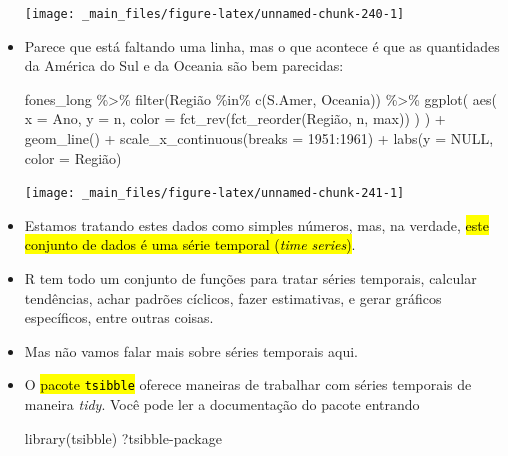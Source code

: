 \documentclass[
  11pt]{report}
\newenvironment{Shaded}{\begin{snugshade}}{\end{snugshade}}
\newcommand{\AttributeTok}[1]{\textcolor[rgb]{0.77,0.63,0.00}{#1}}
\newcommand{\ConstantTok}[1]{\textcolor[rgb]{0.00,0.00,0.00}{#1}}
\newcommand{\DecValTok}[1]{\textcolor[rgb]{0.00,0.00,0.81}{#1}}
\newcommand{\FunctionTok}[1]{\textcolor[rgb]{0.00,0.00,0.00}{#1}}
\newcommand{\NormalTok}[1]{#1}
\newcommand{\SpecialCharTok}[1]{\textcolor[rgb]{0.00,0.00,0.00}{#1}}
\newcommand{\StringTok}[1]{\textcolor[rgb]{0.31,0.60,0.02}{#1}}
\renewenvironment{Shaded}{
    \begin{mdframed}[%
      roundcorner=2pt,%
      innerleftmargin=5pt,%
      innerrightmargin=5pt,%
      topline=true,%
      leftline=true,%
      rightline=true,%
      bottomline=true,%
      linewidth=0.5pt,%
      linecolor=black!20,%
      backgroundcolor=black!2,%
      skipabove=2ex,%
      skipbelow=2.5ex%
    ]%
  }
  {
    \end{mdframed}
  }
\begin{document}
\begin{itemize}
  \begin{center}\texttt{[image: \_main\_files/figure-latex/unnamed-chunk-240-1]} \end{center}
\item
  Parece que está faltando uma linha, mas o que acontece é que as quantidades da América do Sul e da Oceania são bem parecidas:

\begin{Shaded}
\begin{Highlighting}[]
\NormalTok{fones\_long }\SpecialCharTok{\%\textgreater{}\%}
  \FunctionTok{filter}\NormalTok{(Região }\SpecialCharTok{\%in\%} \FunctionTok{c}\NormalTok{(}\StringTok{\textquotesingle{}S.Amer\textquotesingle{}}\NormalTok{, }\StringTok{\textquotesingle{}Oceania\textquotesingle{}}\NormalTok{)) }\SpecialCharTok{\%\textgreater{}\%} 
  \FunctionTok{ggplot}\NormalTok{(}
    \FunctionTok{aes}\NormalTok{(}
      \AttributeTok{x =}\NormalTok{ Ano, }
      \AttributeTok{y =}\NormalTok{ n, }
      \AttributeTok{color =} \FunctionTok{fct\_rev}\NormalTok{(}\FunctionTok{fct\_reorder}\NormalTok{(Região, n, max))}
\NormalTok{    )}
\NormalTok{  ) }\SpecialCharTok{+}
    \FunctionTok{geom\_line}\NormalTok{() }\SpecialCharTok{+}
    \FunctionTok{scale\_x\_continuous}\NormalTok{(}\AttributeTok{breaks =} \DecValTok{1951}\SpecialCharTok{:}\DecValTok{1961}\NormalTok{) }\SpecialCharTok{+}
    \FunctionTok{labs}\NormalTok{(}\AttributeTok{y =} \ConstantTok{NULL}\NormalTok{, }\AttributeTok{color =} \StringTok{\textquotesingle{}Região\textquotesingle{}}\NormalTok{)}
\end{Highlighting}
\end{Shaded}

  \begin{center}\texttt{[image: \_main\_files/figure-latex/unnamed-chunk-241-1]} \end{center}
\item
  Estamos tratando estes dados como simples números, mas, na verdade, {\hl{este conjunto de dados é uma série temporal (\emph{time series})}}.
\item
  R tem todo um conjunto de funções para tratar séries temporais, calcular tendências, achar padrões cíclicos, fazer estimativas, e gerar gráficos específicos, entre outras coisas.
\item
  Mas não vamos falar mais sobre séries temporais aqui.
\item
  O {\hl{pacote {\mbox{\texttt{tsibble}}}}} oferece maneiras de trabalhar com séries temporais de maneira \emph{tidy}. Você pode ler a documentação do pacote entrando

\begin{Shaded}
\begin{Highlighting}[]
\FunctionTok{library}\NormalTok{(tsibble)}
\NormalTok{?}\StringTok{\textasciigrave{}}\AttributeTok{tsibble{-}package}\StringTok{\textasciigrave{}}
\end{Highlighting}
\end{Shaded}
\end{itemize}
\end{document}
